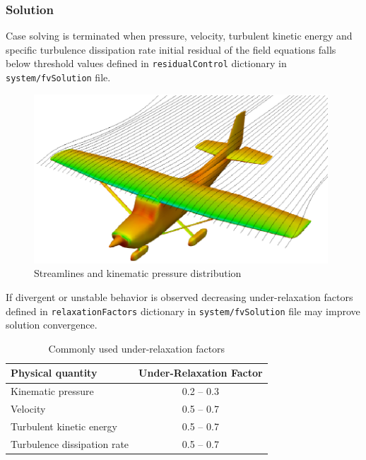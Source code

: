 \subsubsection{Solution}

Case solving is terminated when pressure, velocity, turbulent kinetic energy and specific turbulence dissipation rate initial residual of the field equations falls below threshold values defined in \texttt{residualControl} dictionary in \texttt{system/fvSolution} file.

\begin{figure}[h!]
  \centering
  \includegraphics[width=110mm]{images/openfoam_results.eps}
  \caption{Streamlines and kinematic pressure distribution}
\end{figure}

If divergent or unstable behavior is observed decreasing under-relaxation factors defined in \texttt{relaxationFactors} dictionary in \texttt{system/fvSolution} file may improve solution convergence.
\begin{table}[h!]
  \begin{center}
    \begin{tabular}{ l | c }
      \toprule
      \textbf{Physical quantity} & \textbf{Under-Relaxation Factor} \\ \midrule
      Kinematic pressure          & 0.2 -- 0.3 \\
      Velocity                    & 0.5 -- 0.7 \\
      Turbulent kinetic energy    & 0.5 -- 0.7 \\
      Turbulence dissipation rate & 0.5 -- 0.7 \\
      \bottomrule
    \end{tabular}
    \caption{Commonly used under-relaxation factors \cite{FluentUserGuide15, Guerrero2018} }
  \end{center}
\end{table}

